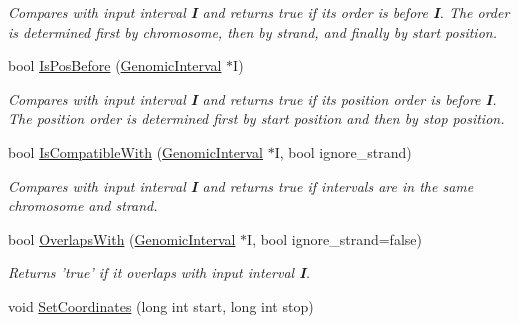\begin{CompactItemize}
\begin{CompactList}\small\item\em Compares with input interval {\bf I} and returns true if its order is before {\bf I}. The order is determined first by chromosome, then by strand, and finally by start position. \item\end{CompactList}\item 
\hypertarget{classGenomicInterval_8fc5d344a103f145db968e536b30f9cf}{
bool \hyperlink{classGenomicInterval_8fc5d344a103f145db968e536b30f9cf}{IsPosBefore} (\hyperlink{classGenomicInterval}{GenomicInterval} $\ast$I)}
\label{classGenomicInterval_8fc5d344a103f145db968e536b30f9cf}

\begin{CompactList}\small\item\em Compares with input interval {\bf I} and returns true if its position order is before {\bf I}. The position order is determined first by start position and then by stop position. \item\end{CompactList}\item 
\hypertarget{classGenomicInterval_b6febc4c04d4919a9485ce8eeec5129d}{
bool \hyperlink{classGenomicInterval_b6febc4c04d4919a9485ce8eeec5129d}{IsCompatibleWith} (\hyperlink{classGenomicInterval}{GenomicInterval} $\ast$I, bool ignore\_\-strand)}
\label{classGenomicInterval_b6febc4c04d4919a9485ce8eeec5129d}

\begin{CompactList}\small\item\em Compares with input interval {\bf I} and returns true if intervals are in the same chromosome and strand. \item\end{CompactList}\item 
\hypertarget{classGenomicInterval_a1c591b6d3cc3c576cec24a3ab67abfb}{
bool \hyperlink{classGenomicInterval_a1c591b6d3cc3c576cec24a3ab67abfb}{OverlapsWith} (\hyperlink{classGenomicInterval}{GenomicInterval} $\ast$I, bool ignore\_\-strand=false)}
\label{classGenomicInterval_a1c591b6d3cc3c576cec24a3ab67abfb}

\begin{CompactList}\small\item\em Returns 'true' if it overlaps with input interval {\bf I}. \item\end{CompactList}\item 
\hypertarget{classGenomicInterval_c76f5c0d3cae831f6cec9d8a27b1c56d}{
void \hyperlink{classGenomicInterval_c76f5c0d3cae831f6cec9d8a27b1c56d}{SetCoordinates} (long int start, long int stop)}
\label{classGenomicInterval_c76f5c0d3cae831f6cec9d8a27b1c56d}


\end{CompactItemize}
